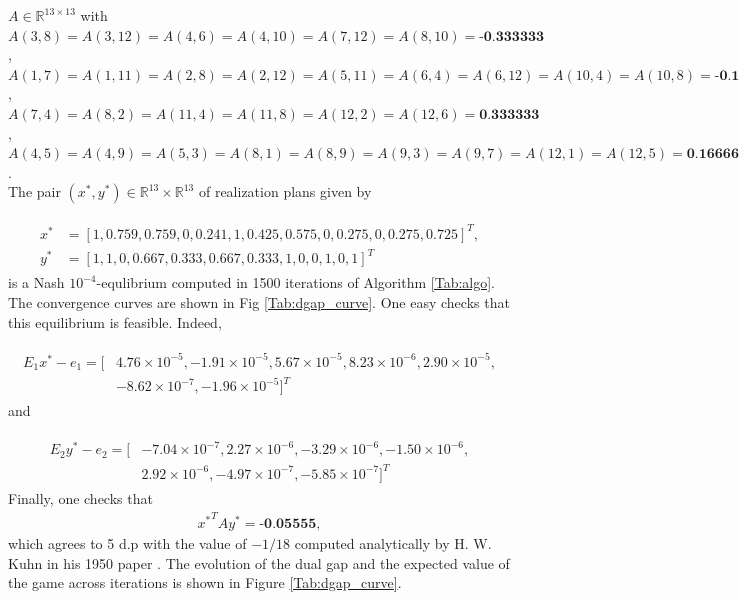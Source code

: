 \documentclass[envcountsame]{llcns2e/llncs}
\begin{document}
 $A \in \mathbb{R}^{13 \times
  13}$ with $A(3,8) = A(3,12) = A(4,6) = A(4,10) = A(7,12) = A(8,10) =
\textbf{-0.333333}$, $A(1,7) = A(1,11) = A(2,8) = A(2,12) = A(5,11) =
A(6,4) = A(6,12) = A(10,4) = A(10,8) = \textbf{-0.166667}$, $A(7,4) =
A(8,2) = A(11,4) = A(11,8) = A(12,2) = A(12,6) = \textbf{0.333333}$,
$A(4,5) = A(4,9) = A(5,3) = A(8,1) = A(8,9) = A(9,3) = A(9,7) =
A(12,1) = A(12,5) = \textbf{0.166667}$.\\

The pair $(x^*, y^*) \in \mathbb{R}^{13} \times \mathbb{R}^{13}$ of
realization plans given by

\begin{eqnarray*}
  \begin{split}
    x^* &= [1, 0.759, 0.759, 0, 0.241, 1, 0.425, 0.575, 0, 0.275, 0,
      0.275, 0.725]^T,\\
    y^* &= [1, 1, 0, 0.667, 0.333, 0.667, 0.333, 1, 0, 0, 1, 0, 1]^T
    \end{split}
\end{eqnarray*}
is a Nash $10^{-4}$-equlibrium computed in 1500 iterations of
Algorithm  \ref{Tab:algo}. The convergence curves are shown
in Fig \ref{Tab:dgap_curve}. One easy checks that this equilibrium is
feasible. Indeed,

\begin{eqnarray*}
  \begin{split}
    E_1x^* - e_1 = [&4.76 \times 10^{-5}, -1.91 \times 10^{-5}, 5.67
      \times 10^{-5}, 8.23 \times 10^{-6}, 2.90 \times 10^{-5}, \\&
      -8.62 \times 10^{-7}, -1.96 \times 10^{-5}]^T
    \end{split}
\end{eqnarray*}
and

\begin{eqnarray*}
  \begin{split}
    E_2y^* - e_2 = [&-7.04 \times 10^{-7}, 2.27 \times 10^{-6}, -3.29
      \times 10^{-6}, -1.50 \times 10^{-6},\\
      &2.92 \times 10^{-6}, -4.97 \times 10^{-7}, -5.85 \times
      10^{-7}]^T
    \end{split}
\end{eqnarray*}
Finally, one checks that
\begin{eqnarray*}
  {x^*}^TAy^* = \textbf{-0.05555},
\end{eqnarray*}
 which agrees to 5 d.p with the value of $-1 / 18$ computed
 analytically by H. W. Kuhn in his 1950 paper \cite{kuhn}. The
 evolution of the dual gap and the expected value of the game across
 iterations is shown in Figure \ref{Tab:dgap_curve}.
\end{document}
